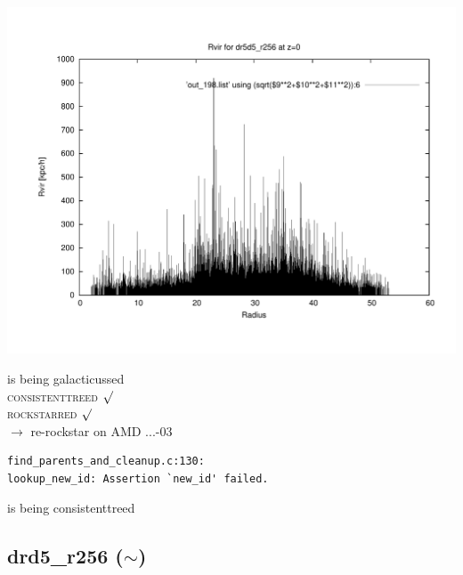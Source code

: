 \includegraphics[scale=0.3]{dr5d5_r256/plot_rvir_z0.pdf}

is being galacticussed \\
\textsc{consistenttreed} $\surd$ \\
\textsc{rockstarred} $\surd$ \\
$\rightarrow$  re-rockstar on AMD ...-03 \\
\begin{verbatim}
find_parents_and_cleanup.c:130: 
lookup_new_id: Assertion `new_id' failed.
\end{verbatim}
is being consistenttreed \\ 

% 
%
%
%
%
%
%
%

\newpage

\subsection{drd5\_r256 ($\sim$)} 

